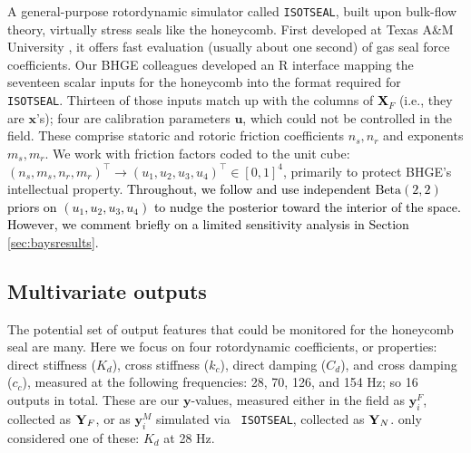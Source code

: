 \documentclass[12pt]{article}
\newcommand{\blu}[1]{\textcolor{black}{#1}} %
\newcommand{\blunew}[1]{\textcolor{black}{#1}} %
\begin{document}
A general-purpose rotordynamic simulator called {\tt ISOTSEAL}, built upon
bulk-flow theory, virtually stress seals like the honeycomb. First developed
at Texas A\&M University \citep{isotseal}, it offers
fast evaluation (usually about one second) of gas seal force coefficients. Our
BHGE colleagues developed an {\sf R} interface mapping the seventeen scalar
inputs for the honeycomb into the format required for {\tt
ISOTSEAL}. Thirteen of those inputs match up with the columns of
\blunew{$\mathbf{X}_{F}$} (i.e., they are $\mathbf{x}$'s); four are calibration
parameters $\mathbf{u}$, which could not be controlled in the
field. These comprise statoric and rotoric friction coefficients $n_s, n_r$
and exponents $m_s, m_r$. We work with friction
factors coded to the unit cube: $(n_s, m_s, n_r, m_r)^\top \rightarrow (u_1,
u_2, u_3, u_4)^\top \in [0,1]^4$, primarily to protect BHGE's intellectual
property.  \blu{Throughout, we follow \citet{Huang:2018} and use independent
$\text{Beta}(2,  2)$ priors on $(u_1, u_2, u_3, u_4)$ to nudge the posterior
toward the interior of the space.  However, we comment briefly on a limited
sensitivity analysis in Section \ref{sec:baysresults}.}


\subsection{Multivariate outputs}
\label{sec:multioutputs}

The potential set of output features that could be monitored for the honeycomb
seal are many.  Here we focus on four rotordynamic coefficients, or
properties: direct stiffness ($K_d$),  cross stiffness ($k_c$), direct damping
($C_d$), and cross damping ($c_c$), measured at the following frequencies: 28,
70, 126, and 154 Hz; so 16 outputs in total. These are our
$\mathbf{y}$-values, measured either in the field as $\mathbf{y}^F_i$,
collected as $\mathbf{Y}_{\blunew{F}}$, or as $\mathbf{y}^M_i$ simulated via {\tt
ISOTSEAL}, collected as $\mathbf{Y}_{\blunew{N}}$.  \cite{Huang:2018} only considered
one of these: $K_d$ at 28 Hz.
\end{document}
